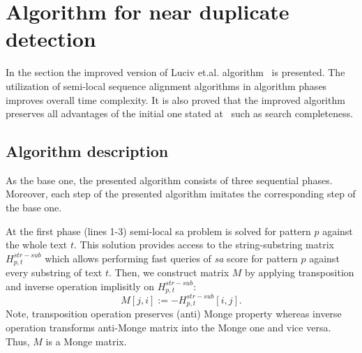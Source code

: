 \section{Algorithm for near duplicate detection}
\label{section:luciv}

In the section the improved version of Luciv et.al. algorithm~\cite{luciv2019interactive} is presented.
The utilization of semi-local sequence alignment algorithms in algorithm phases improves overall time complexity.
It is also proved that the improved algorithm preserves all advantages of the initial one stated at~\cite{luciv2019interactive} such as search completeness.

\subsection{Algorithm description}

As the base one, the presented algorithm consists of three sequential phases.
Moreover, each step of the presented algorithm imitates the corresponding step of the base one.

At the first phase (lines 1-3) semi-local sa problem is solved for pattern $p$ against the whole text $t$.
This solution provides access to the string-substring matrix $H^{str-sub}_{p,t}$ which allows performing fast queries of \emph{sa} score for pattern $p$ against every substring of text $t$.
Then, we construct matrix $M$ by applying transposition and inverse operation implisitly on $H^{str-sub}_{p,t}$:
$$M[j,i]:= -H^{str-sub}_{p,t}[i,j].$$
Note, transposition operation preserves (anti) Monge property whereas inverse operation transforms anti-Monge matrix into the Monge one and vice versa. 
Thus, $M$ is a Monge matrix.


